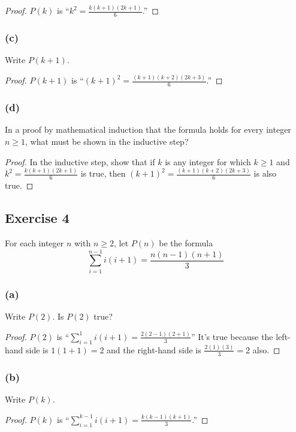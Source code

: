 \documentclass[14pt]{extarticle}
\newcommand{\dps}{\displaystyle}
\begin{document}
\begin{proof}
    $P(k)$ is ``$\dps k^2 = \frac{k(k+1)(2k + 1)}{6}$.''
\end{proof}

\subsubsection{(c)}
Write $P(k + 1)$.

\begin{proof}
    $P(k+1)$ is ``$\dps (k+1)^2 = \frac{(k+1)(k+2)(2k + 3)}{6}$.''
\end{proof}

\subsubsection{(d)}
In a proof by mathematical induction that the formula holds for every integer $n \geq 1$, what must be shown in the inductive step?

\begin{proof}
    In the inductive step, show that if $k$ is any integer for which $k \geq 1$ and $\dps k^2 = \frac{k(k+1)(2k + 1)}{6}$ is true, then $\dps (k+1)^2 = \frac{(k+1)(k+2)(2k + 3)}{6}$ is also true.
\end{proof}

\subsection{Exercise 4}
For each integer $n$ with $n \geq 2$, let $P(n)$ be the formula
\[
    \sum_{i=1}^{n-1}i(i+1) = \frac{n(n-1)(n+1)}{3}
\]
\subsubsection{(a)}
Write $P(2)$. Is $P(2)$ true?

\begin{proof}
    $P(2)$ is ``$\dps \sum_{i=1}^{1}i(i+1) = \frac{2(2-1)(2+1)}{3}$'' It's true because the left-hand side is $1(1+1) = 2$ and the right-hand side is $\dps \frac{2(1)(3)}{3} = 2$ also.
\end{proof}

\subsubsection{(b)}
Write $P(k)$.

\begin{proof}
    $P(k)$ is ``$\dps \sum_{i=1}^{k-1}i(i+1) = \frac{k(k-1)(k+1)}{3}$.''
\end{proof}
\end{document}
